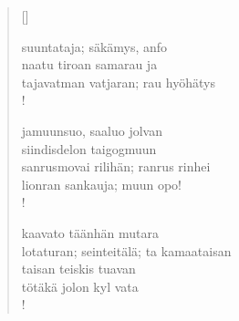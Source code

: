 \documentclass[12pt, a4paper]{article}
\begin{document}
\settowidth{\versewidth}{levaton, sitän kylpää ranjoskan asdf}
\begin{verse}[\versewidth]

suuntataja; säkämys, anfo \\
naatu tiroan samarau ja \\
tajavatman vatjaran; rau hyöhätys \\!



jamuunsuo, saaluo jolvan \\
siindisdelon taigogmuun \\
sanrusmovai rilihän; ranrus rinhei \\
lionran sankauja; muun opo! \\!



kaavato täänhän mutara \\
lotaturan; seinteitälä; ta kamaataisan \\
taisan teiskis tuavan \\
tötäkä jolon kyl vata \\!


\end{verse}
\newpage
\end{document}
